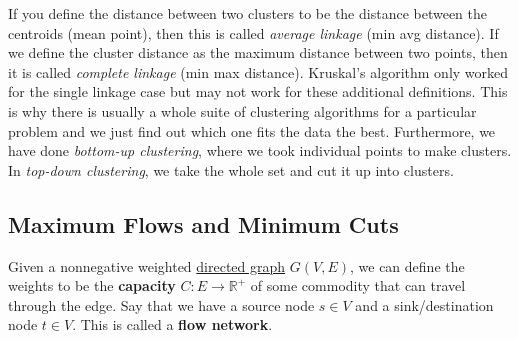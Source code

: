   If you define the distance between two clusters to be the distance between the centroids (mean point), then this is called \textit{average linkage} (min avg distance). If we define the cluster distance as the maximum distance between two points, then it is called \textit{complete linkage} (min max distance). Kruskal's algorithm only worked for the single linkage case but may not work for these additional definitions. This is why there is usually a whole suite of clustering algorithms for a particular problem and we just find out which one fits the data the best. Furthermore, we have done \textit{bottom-up clustering}, where we took individual points to make clusters. In \textit{top-down clustering}, we take the whole set and cut it up into clusters.  

\subsection{Maximum Flows and Minimum Cuts} 

  \begin{definition}
    \label{def:flow-network}
    Given a nonnegative weighted \hyperref[def:directed-graph]{directed graph} $G(V, E)$, we can define the weights to be the \textbf{capacity} $C: E \rightarrow \mathbb{R}^+$ of some commodity that can travel through the edge. Say that we have a source node $s \in V$ and a sink/destination node $t \in V$. This is called a \textbf{flow network}.
  \end{definition}

